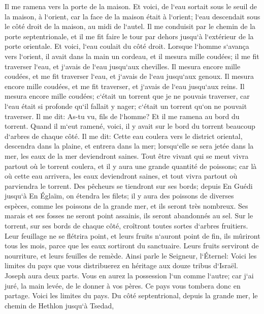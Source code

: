 \verse Il me ramena vers la porte de la maison. Et voici, de l`eau sortait sous le seuil de la maison, à l`orient, car la face de la maison était à l`orient; l`eau descendait sous le côté droit de la maison, au midi de l`autel. 
\verse Il me conduisit par le chemin de la porte septentrionale, et il me fit faire le tour par dehors jusqu`à l`extérieur de la porte orientale. Et voici, l`eau coulait du côté droit. 
\verse Lorsque l`homme s`avança vers l`orient, il avait dans la main un cordeau, et il mesura mille coudées; il me fit traverser l`eau, et j`avais de l`eau jusqu`aux chevilles. 
\verse Il mesura encore mille coudées, et me fit traverser l`eau, et j`avais de l`eau jusqu`aux genoux. Il mesura encore mille coudées, et me fit traverser, et j`avais de l`eau jusqu`aux reins. 
\verse Il mesura encore mille coudées; c`était un torrent que je ne pouvais traverser, car l`eau était si profonde qu`il fallait y nager; c`était un torrent qu`on ne pouvait traverser. 
\verse Il me dit: As-tu vu, fils de l`homme? Et il me ramena au bord du torrent. 
\verse Quand il m`eut ramené, voici, il y avait sur le bord du torrent beaucoup d`arbres de chaque côté. 
\verse Il me dit: Cette eau coulera vers le district oriental, descendra dans la plaine, et entrera dans la mer; lorsqu`elle se sera jetée dans la mer, les eaux de la mer deviendront saines. 
\verse Tout être vivant qui se meut vivra partout où le torrent coulera, et il y aura une grande quantité de poissons; car là où cette eau arrivera, les eaux deviendront saines, et tout vivra partout où parviendra le torrent. 
\verse Des pêcheurs se tiendront sur ses bords; depuis En Guédi jusqu`à En Églaïm, on étendra les filets; il y aura des poissons de diverses espèces, comme les poissons de la grande mer, et ils seront très nombreux. 
\verse Ses marais et ses fosses ne seront point assainis, ils seront abandonnés au sel. 
\verse Sur le torrent, sur ses bords de chaque côté, croîtront toutes sortes d`arbres fruitiers. Leur feuillage ne se flétrira point, et leurs fruits n`auront point de fin, ils mûriront tous les mois, parce que les eaux sortiront du sanctuaire. Leurs fruits serviront de nourriture, et leurs feuilles de remède. 
\verse Ainsi parle le Seigneur, l`Éternel: Voici les limites du pays que vous distribuerez en héritage aux douze tribus d`Israël. Joseph aura deux parts. 
\verse Vous en aurez la possession l`un comme l`autre; car j`ai juré, la main levée, de le donner à vos pères. Ce pays vous tombera donc en partage. 
\verse Voici les limites du pays. Du côté septentrional, depuis la grande mer, le chemin de Hethlon jusqu`à Tsedad, 
